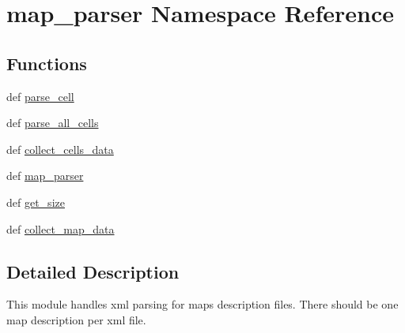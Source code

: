 \hypertarget{namespacemap__parser}{\section{map\-\_\-parser \-Namespace \-Reference}
\label{namespacemap__parser}
}
\subsection*{\-Functions}
\begin{DoxyCompactItemize}
\item 
def \hyperlink{namespacemap__parser_a00ad0e89a74d4dc447b599e8e9b60e65}{parse\-\_\-cell}
\item 
def \hyperlink{namespacemap__parser_a8bf79bde0244367adb3cc7a302e4af47}{parse\-\_\-all\-\_\-cells}
\item 
def \hyperlink{namespacemap__parser_a2f03ea0729eb1e421f4d986e9c18519e}{collect\-\_\-cells\-\_\-data}
\item 
def \hyperlink{namespacemap__parser_a4837b9f41f6ac6916382277c63ed2e29}{map\-\_\-parser}
\item 
def \hyperlink{namespacemap__parser_af7c6fc1bf39d04b753e7985e255e6e9e}{get\-\_\-size}
\item 
def \hyperlink{namespacemap__parser_af1a1612af86e8bf74604bc25b335e055}{collect\-\_\-map\-\_\-data}
\end{DoxyCompactItemize}


\subsection{\-Detailed \-Description}
\begin{DoxyVerb}
This module handles xml parsing for maps description files.
There should be one map description per xml file.
\end{DoxyVerb}
 


